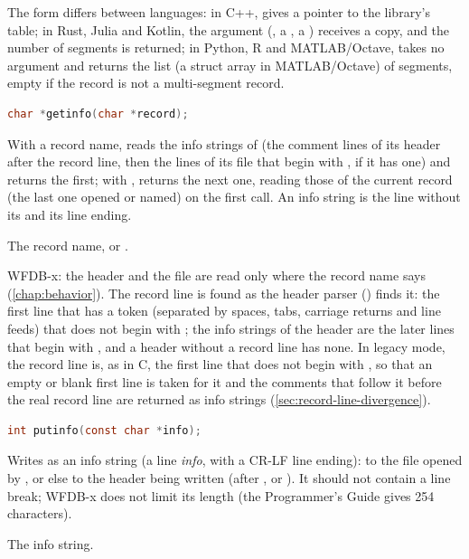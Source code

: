 The form differs between languages: in C++,  gives a pointer to the library's table; in Rust, Julia and
Kotlin, the argument (, a , a
) receives a copy, and the number of segments is
returned; in Python, R and MATLAB/Octave,  takes no
argument and returns the list (a struct array in MATLAB/Octave) of segments,
empty if the record is not a multi-segment record.

\begin{lstlisting}[language=C,style=signature]
char *getinfo(char *record);
\end{lstlisting}
With a record name, reads the info strings of  (the comment
lines of its header after the record line, then the lines of its
 file that begin with \code{\#}, if it has one) and returns the
first; with , returns the next one, reading those of the current
record (the last one opened or named) on the first call. An info string is
the line without its \code{\#} and its line ending.
\begin{params}
\item[record] The record name, or .
\end{params}

WFDB-x: the header and the  file are read only where the record
name says (\cref{chap:behavior}). The record line is found as the header
parser () finds it: the first line that has a token
(separated by spaces, tabs, carriage returns and line feeds) that does not
begin with \code{\#}; the info strings of the header are the later lines that
begin with \code{\#}, and a header without a record line has none. In legacy
mode, the record line is, as in C, the first line that does not begin with
\code{\#}, so that an empty or blank first line is taken for it and the
comments that follow it before the real record line are returned as info
strings (\cref{sec:record-line-divergence}).

\begin{lstlisting}[language=C,style=signature]
int putinfo(const char *info);
\end{lstlisting}
Writes  as an info string (a line \code{\#}\emph{info}, with a
CR-LF line ending): to the  file opened by , or
else to the header being written (after , 
or ). It should not contain a line break; WFDB-x does not
limit its length (the Programmer's Guide gives 254 characters).
\begin{params}
\item[info] The info string.
\end{params}

